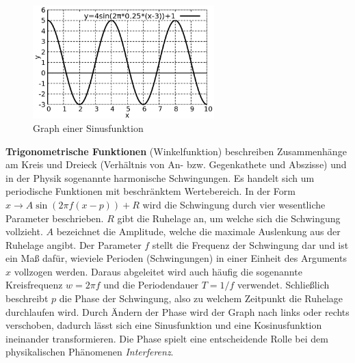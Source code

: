 \begin{minipage}[t]{1\textwidth}
    \begin{figure}
        \centering
        \includegraphics[width=7cm]{./gnuplot/base-function-sine}
        \caption{Graph einer Sinusfunktion}
        \label{fig:ExBaseFunSine}
    \end{figure}
    \textbf{Trigonometrische Funktionen} (Winkelfunktion) beschreiben Zusammenhänge am Kreis und Dreieck (Verhältnis von An- bzw. Gegenkathete und Abszisse) und in der Physik sogenannte harmonische Schwingungen. Es handelt sich um periodische Funktionen mit beschränktem Wertebereich. In der Form $x \to A\sin(2 \pi f (x-p)) + R$ wird die Schwingung durch vier wesentliche Parameter beschrieben. $R$ gibt die Ruhelage an, um welche sich die Schwingung vollzieht. $A$ bezeichnet die Amplitude, welche die maximale Auslenkung aus der Ruhelage angibt. Der Parameter $f$ stellt die Frequenz der Schwingung dar und ist ein Maß dafür, wieviele Perioden (Schwingungen) in einer Einheit des Arguments $x$ vollzogen werden. Daraus abgeleitet wird auch häufig die sogenannte Kreisfrequenz $w=2\pi f$ und die Periodendauer $T = 1 / f$ verwendet. Schließlich beschreibt $p$ die Phase der Schwingung, also zu welchem Zeitpunkt die Ruhelage durchlaufen wird. Durch Ändern der Phase wird der Graph nach links oder rechts verschoben, dadurch lässt sich eine Sinusfunktion und eine Kosinusfunktion ineinander transformieren. Die Phase spielt eine entscheidende Rolle bei dem physikalischen Phänomenen \emph{Interferenz}.
\end{minipage}

